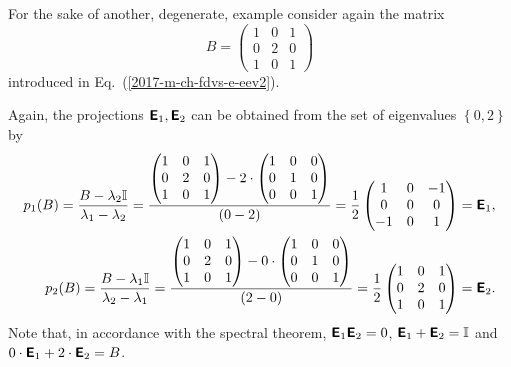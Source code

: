 {For the sake of another, degenerate, example consider again the
{matrix}
\begin{equation}
B=
\begin{pmatrix}
1&0&1\\
0&2&0\\
1&0&1
\end{pmatrix}
\end{equation}
introduced in Eq.~(\ref{2017-m-ch-fdvs-e-eev2}).



Again, the projections $\textsf{\textbf{E}}_1, \textsf{\textbf{E}}_2$
can be obtained from  the set of eigenvalues $\left\{  0,2 \right\}$ by
\begin{equation}
\begin{split}
p_1(B)=   \frac{B-\lambda_2{\Bbb I}}{\lambda_1-\lambda_2}
=
\frac{
\begin{pmatrix}
1&0&1\\
0&2&0\\
1&0&1
\end{pmatrix}
-
2\cdot
\begin{pmatrix}
1&0&0\\
0&1&0\\
0&0&1
\end{pmatrix}
}
{(0-2)}
=
\frac{1}{2}
\begin{pmatrix}
1&0&-1\\
0&0&0\\
-1&0&1
\end{pmatrix}
=\textsf{\textbf{E}}_1
,\\
p_2(B)=   \frac{B-\lambda_1{\Bbb I}}{\lambda_2-\lambda_1}
=
\frac{
\begin{pmatrix}
1&0&1\\
0&2&0\\
1&0&1
\end{pmatrix}
-
0\cdot
\begin{pmatrix}
1&0&0\\
0&1&0\\
0&0&1
\end{pmatrix}
}
{(2-0)}
=
\frac{1}{2}
\begin{pmatrix}
1&0&1\\
0&2&0\\
1&0&1
\end{pmatrix}
=\textsf{\textbf{E}}_2.
\end{split}
\end{equation}
Note that, in accordance with the spectral theorem,
$\textsf{\textbf{E}}_1 \textsf{\textbf{E}}_2=0 $,
$\textsf{\textbf{E}}_1+\textsf{\textbf{E}}_2={\Bbb I}$
and
$0\cdot \textsf{\textbf{E}}_1+2\cdot \textsf{\textbf{E}}_2=B$.

\eexample
}







